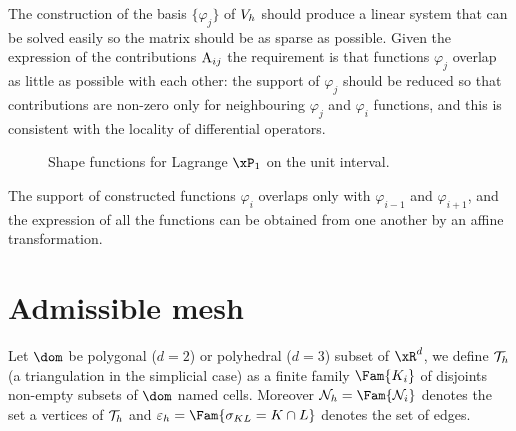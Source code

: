 \medskip
The construction of the basis $\lbrace\varphi_j\rbrace$ of ${{V}}_h$ should produce a linear system that can be solved easily so the matrix should be as sparse as possible.
Given the expression of the contributions ${\mathrm A}_{ij}$ the requirement is that functions $\varphi_j$ overlap as little as possible with each other: the support of $\varphi_j$ should be reduced so that contributions are non-zero only for neighbouring $\varphi_j$ and $\varphi_i$ functions, and this is consistent with the locality of differential operators.

\begin{figure}[h!]
\centering
{}
\caption{Shape functions for Lagrange $\xPone$ on the unit interval.}
\end{figure}

\medskip
The support of constructed functions $\varphi_i$ overlaps only with $\varphi_{i-1}$ and $\varphi_{i+1}$, and the expression of all the functions can be obtained from one another by an affine transformation.

\section{Admissible mesh}

\begin{dfntn}[Mesh]
Let $\dom$ be polygonal ($d=2$) or polyhedral ($d=3$) subset of $\xR^d$, we define ${\mathcal T}_h$ (a triangulation in the simplicial case) as a finite family $\Fam{K_i}$ of disjoints non-empty subsets of $\dom$ named cells.
Moreover $\mathcal N_h = \Fam{\mathcal N_i}$ denotes the set a vertices of ${\mathcal T}_h$ and $\varepsilon_h = \Fam{\sigma_{KL} = K\cap L}$ denotes the set of edges.
\end{dfntn}

